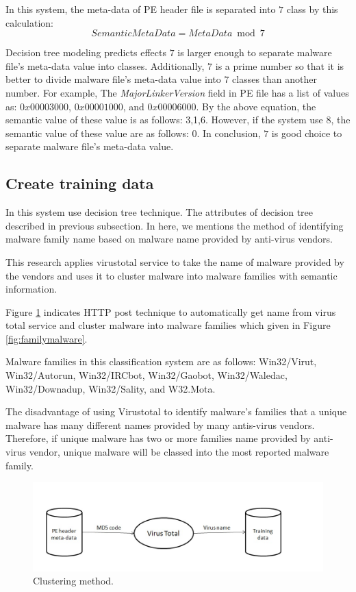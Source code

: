 In this system, the meta-data of PE header file is separated into $7$ class by this calculation:
\begin{equation}
SemanticMetaData = MetaData \bmod 7
\end{equation} 

Decision tree modeling predicts effects $7$ is larger enough to separate malware file's meta-data value into classes. Additionally, $7$ is a prime number so that it is better to divide malware file's meta-data value into $7$ classes than another number. For example, The \emph{MajorLinkerVersion} field in PE file has a list of values as: $0x00003000$, $0x00001000$, and $0x00006000$. By the above equation, the semantic value of these value is as follows: 3,1,6. However, if the system use $8$, the semantic value of these value are as follows: 0. In conclusion, $7$ is good choice to separate malware file's meta-data value.

\subsection{Create training data}

In this system use decision tree technique. The attributes of decision tree described in previous subsection. In here, we mentions the method of identifying malware family name based on malware name provided by anti-virus vendors.

This research applies virustotal service to take the name of malware provided by the vendors and uses it to cluster malware into malware families with semantic information.

Figure \ref{fig:clustering} indicates HTTP post technique to automatically get name from virus total service and cluster malware into malware families which given in Figure \ref{fig:familymalware}.

Malware families in this classification system are as follows: Win32/Virut, Win32/Autorun, Win32/IRCbot, Win32/Gaobot, Win32/Waledac, Win32/Downadup, Win32/Sality, and W32.Mota. 

The disadvantage of using Virustotal to identify malware's families that a unique malware has many different names provided by many antis-virus vendors. Therefore, if unique malware has two or more families name provided by anti-virus vendor, unique malware will be classed into the most reported malware family.
\begin{figure}[h!]
\centering
\includegraphics[width=1\textwidth]{graph/clustering.jpg}
\caption{Clustering method.}
\label{fig:clustering}
\end{figure}

